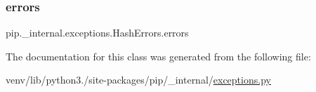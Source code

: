 \subsubsection{\texorpdfstring{errors}{errors}}
{\footnotesize\ttfamily pip.\+\_\+internal.\+exceptions.\+Hash\+Errors.\+errors}



The documentation for this class was generated from the following file\+:\begin{DoxyCompactItemize}
\item 
venv/lib/python3./site-\/packages/pip/\+\_\+internal/\hyperlink{pip_2__internal_2exceptions_8py}{exceptions.\+py}\end{DoxyCompactItemize}

